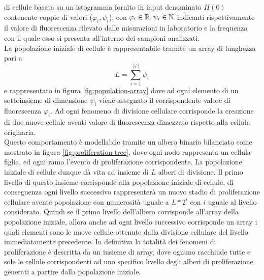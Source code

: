 di cellule basata su un istogramma fornito in input denominato $H(0)$
contenente coppie di valori ($\varphi_{i}, \psi_{i}$),
con $\varphi_{i} \in \mathbb{R}, \psi_{i} \in \mathbb{N}$ indicanti rispettivamente il
valore di fluorescenza rilevato dalle misurazioni in laboratorio e
la frequenza con il quale esso si presenta all'interno dei campioni analizzati.
\\
La popolazione iniziale di cellule è rappresentabile tramite un array di
lunghezza pari a $$L = \sum_{i=1}^{|\varphi|} \psi_{i}$$
e rappresentato in figura \ref{fig:population-array} dove ad ogni elemento
di un sottoinsieme di dimensione $\psi_{i}$ viene assegnato il corrispondente
valore di fluorescenza $\varphi_{i}$.
Ad ogni fenomeno di divisione cellulare corrisponde
la creazione di due nuove cellule aventi valore di fluorescenza dimezzato
rispetto alla cellula originaria.
\\
Questo comportamento è modellabile tramite un albero binario bilanciato
come mostrato in figura \ref{fig:proliferation-tree}, dove ogni nodo rappresenta
un cellula figlia, ed ogni ramo l'evento di proliferazione corrispondente.
La popolazione iniziale di cellule dunque dà vita ad insieme di $L$ alberi di
divisione. Il primo livello di questo insieme corrisponde alla popolazione
iniziale di cellule, di conseguenza ogni livello successivo rappresenterà
un nuovo stadio di proliferazione cellulare avente popolazione con numerosità
uguale a $L * 2^{i}$ con $i$ uguale al livello considerato.
Quindi se il primo livello dell'albero corrisponde all'array della popolazione
iniziale, allora anche ad ogni livello successivo corrisponde un array i quali
elementi sono le nuove cellule ottenute dalla divisione cellulare del livello
immediatamente precedente.
In definitiva la totalità dei fenomeni di proliferazione è descritta da un
insieme di array, dove ognuno racchiude tutte e sole le cellule
corrispondenti ad uno specifico livello degli alberi di proliferazione generati
a partire dalla popolazione iniziale.
